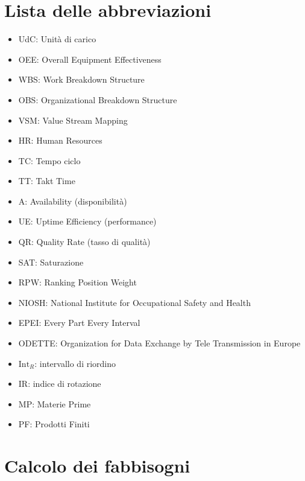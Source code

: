 \documentclass[11pt]{article}
\begin{document}
\newpage
\thispagestyle{empty}
\listoffigures

\newpage
\thispagestyle{empty}
\section*{Lista delle abbreviazioni}
\begin{itemize}
    \item UdC: Unità di carico
    \item OEE: Overall Equipment Effectiveness
    \item WBS: Work Breakdown Structure
    \item OBS: Organizational Breakdown Structure
    \item VSM: Value Stream Mapping
    \item HR: Human Resources
    \item TC: Tempo ciclo
    \item TT: Takt Time
    \item A: Availability (disponibilità)
    \item UE: Uptime Efficiency (performance)
    \item QR: Quality Rate (tasso di qualità)
    \item SAT: Saturazione
    \item RPW: Ranking Position Weight
    \item NIOSH: National Institute for Occupational Safety and Health
    \item EPEI: Every Part Every Interval
    \item ODETTE: Organization for Data Exchange by Tele Transmission in Europe
    \item $\text{Int}_R$: intervallo di riordino
    \item IR: indice di rotazione
    \item MP: Materie Prime
    \item PF: Prodotti Finiti
\end{itemize}
\newpage

\section{Calcolo dei fabbisogni}
\end{document}
